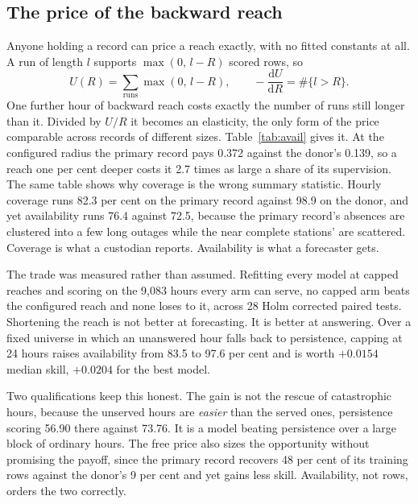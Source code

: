 \documentclass[conference]{IEEEtran}
\begin{document}
\subsection{The price of the backward reach}

Anyone holding a record can price a reach exactly, with no fitted constants at all. A run of
length $l$ supports $\max(0,\,l-R)$ scored rows, so
\begin{equation}
U(R)=\sum_{\mathrm{runs}}\max(0,\,l-R),
\qquad
-\frac{\mathrm{d}U}{\mathrm{d}R}=\#\{l>R\} .
\label{eq:identity}
\end{equation}
One further hour of backward reach costs exactly the number of runs still longer than it.
Divided by $U/R$ it becomes an elasticity, the only form of the price comparable across records
of different sizes. Table~\ref{tab:avail} gives it. At the configured radius the primary record
pays 0.372 against the donor's 0.139, so a reach one per cent deeper costs it 2.7 times as large
a share of its supervision. The same table shows why coverage is the wrong summary statistic.
Hourly coverage runs 82.3 per cent on the primary record against 98.9 on the
donor, and yet availability runs 76.4 against 72.5, because the primary record's absences are
clustered into a few long outages while the near complete stations' are scattered. Coverage is
what a custodian reports. Availability is what a forecaster gets.

The trade was measured rather than assumed. Refitting every model at capped reaches and scoring
on the 9{,}083 hours every arm can serve, no capped arm beats the configured reach and none
loses to it, across 28 Holm corrected paired tests. Shortening the reach is not better at
forecasting. It is better at answering. Over a fixed universe in which an unanswered hour falls
back to persistence, capping at 24 hours raises availability from 83.5 to 97.6 per cent and is
worth $+0.0154$ median skill, $+0.0204$ for the best model.

Two qualifications keep this honest. The gain is not the rescue of catastrophic hours, because
the unserved hours are \emph{easier} than the served ones, persistence scoring 56.90 there
against 73.76. It is a model beating persistence over a large block of ordinary hours. The free
price also sizes the opportunity without promising the payoff, since the primary record recovers
48 per cent of its training rows against the donor's 9 per cent and yet gains less skill.
Availability, not rows, orders the two correctly.
\end{document}
